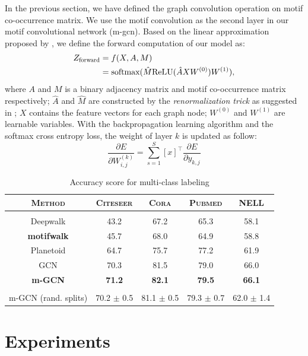 \documentclass{article}
\theoremstyle{definition}
\begin{document}
In the previous section, we have defined the graph convolution
operation on motif co-occurrence matrix. We use the motif convolution
as the second layer in our motif convolutional network (m-gcn). Based on the 
linear approximation proposed by \citeauthor{gcn}, we define the forward
computation of our model as:
\begin{equation} \label{eq:2}
    \begin{aligned}
    Z_{\scalebox{0.75}{forward}} &= f(X,A,M) \\
    &= \mbox{softmax}(\hat{M} \mbox{ReLU}(\hat{A}XW^{(0)})W^{(1)}),
    \end{aligned}
\end{equation}
where $A$ and $M$ is a binary adjacency matrix and motif co-occurrence
matrix respectively; $\hat{A}$ and $\hat{M}$ are constructed by the
\emph{renormalization trick} as suggested in \cite{gcn}; $X$ contains
the feature vectors for each graph node; $W^{(0)}$ and $W^{(1)}$ are
learnable variables. With the backpropagation learning algorithm and the
softmax cross entropy loss, the weight of layer $k$ is updated as follow: 
\begin{equation}
\label{eq:3}
\frac{\partial E}{\partial W^{(k)}_{i,j}} = \sum^S_{s=1} [x]^\top \frac{\partial E}{\partial y_{k,j}}
\end{equation}

\begin{table}
\centering
\begin{tabular}{c | c c c c}
\textbf{\textsc{Method}} & \textsc{Citeseer} & \textsc{Cora} & \textsc{Pubmed} & \textsc{NELL} \\
\hline \\
Deepwalk & 43.2 & 67.2 & 65.3 & 58.1 \\
\textbf{motifwalk} & 45.7 & 68.0 & 64.9 & 58.8 \\
Planetoid & 64.7 & 75.7 & 77.2 & 61.9 \\
GCN & 70.3 & 81.5 & 79.0 & 66.0 \\
\textbf{m-GCN} & \textbf{71.2} & \textbf{82.1} & \textbf{79.5} & \textbf{66.1} \\
\hline \\
m-GCN (rand. splits) & 70.2 $\pm$ 0.5 & 81.1 $\pm$ 0.5 & 79.3 $\pm$ 0.7 & 62.0 $\pm$ 1.4 \\
\end{tabular}%
\caption{Accuracy score for multi-class labeling}
\label{t:re}
\end{table}

\section{Experiments}
\end{document}
